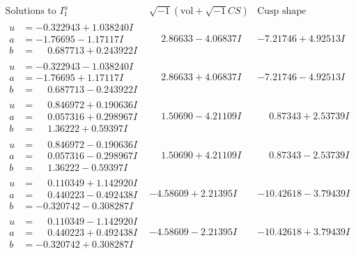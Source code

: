 \documentclass[1p]{elsarticle_modified}
\theoremstyle{definition}
\newcommand{\I}{\sqrt{-1}}
\begin{document}
$$\begin{array}{c|c|c}  
\text{Solutions to }I^u_{1}& \I (\text{vol} + \sqrt{-1}CS) & \text{Cusp shape}\\
 \hline 
\begin{aligned}
u &= -0.322943 + 1.038240 I \\
a &= -1.76695 - 1.17117 I \\
b &= \phantom{-}0.687713 + 0.243922 I\end{aligned}
 & \phantom{-}2.86633 - 4.06837 I & -7.21746 + 4.92513 I \\ \hline\begin{aligned}
u &= -0.322943 - 1.038240 I \\
a &= -1.76695 + 1.17117 I \\
b &= \phantom{-}0.687713 - 0.243922 I\end{aligned}
 & \phantom{-}2.86633 + 4.06837 I & -7.21746 - 4.92513 I \\ \hline\begin{aligned}
u &= \phantom{-}0.846972 + 0.190636 I \\
a &= \phantom{-}0.057316 + 0.298967 I \\
b &= \phantom{-}1.36222 + 0.59397 I\end{aligned}
 & \phantom{-}1.50690 - 4.21109 I & \phantom{-}0.87343 + 2.53739 I \\ \hline\begin{aligned}
u &= \phantom{-}0.846972 - 0.190636 I \\
a &= \phantom{-}0.057316 - 0.298967 I \\
b &= \phantom{-}1.36222 - 0.59397 I\end{aligned}
 & \phantom{-}1.50690 + 4.21109 I & \phantom{-}0.87343 - 2.53739 I \\ \hline\begin{aligned}
u &= \phantom{-}0.110349 + 1.142920 I \\
a &= \phantom{-}0.440223 - 0.492438 I \\
b &= -0.320742 - 0.308287 I\end{aligned}
 & -4.58609 + 2.21395 I & -10.42618 - 3.79439 I \\ \hline\begin{aligned}
u &= \phantom{-}0.110349 - 1.142920 I \\
a &= \phantom{-}0.440223 + 0.492438 I \\
b &= -0.320742 + 0.308287 I\end{aligned}
 & -4.58609 - 2.21395 I & -10.42618 + 3.79439 I \\ \hline\begin{aligned}

\end{aligned}
\end{array}$$
\end{document}
